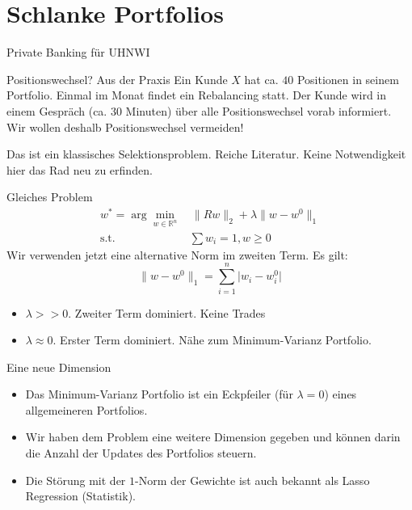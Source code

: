 \documentclass[10pt]{beamer}
\newcommand{\R}{\mathbb R}
\providecommand{\abs}[1]{\lvert#1\rvert}
\providecommand{\norm}[1]{\lVert#1\rVert}
\begin{document}
\section{Schlanke Portfolios}
\begin{frame}{Private Banking für UHNWI}
\begin{alertblock}{Positionswechsel? Aus der Praxis}
Ein Kunde $X$ hat ca. $40$ Positionen in seinem Portfolio. Einmal im Monat findet ein Rebalancing statt. Der Kunde wird in einem  Gespräch (ca. $30$ Minuten)  über alle Positionswechsel vorab informiert. Wir wollen deshalb Positionswechsel vermeiden!
\end{alertblock}

Das ist ein klassisches \alert{Selektionsproblem}. Reiche Literatur. Keine Notwendigkeit hier das Rad neu zu erfinden. 
\end{frame}

\begin{frame}{Gleiches Problem}
\begin{align}
w^*=\arg\min_{w\in\R^n}&\, \norm{Rw}_2 + \lambda \norm{w-w^0}_1 \\
\text{s.t. }&\sum w_i = 1, w\geq 0\nonumber
\end{align}
Wir verwenden jetzt eine alternative Norm im zweiten Term. Es gilt:
\[ 
\norm{w - w^0}_1 = \sum_{i=1}^n \abs{w_i-w^0_i}
\]
\begin{itemize}
\item $\lambda >> 0$. Zweiter Term dominiert. Keine Trades
\item $\lambda \approx 0$. Erster Term dominiert. Nähe zum Minimum-Varianz Portfolio.
\end{itemize}
\end{frame}

\begin{frame}{Eine neue Dimension}
\begin{itemize}
\item Das Minimum-Varianz Portfolio ist ein Eckpfeiler (für $\lambda = 0$) eines allgemeineren Portfolios.
\item Wir haben dem Problem eine weitere Dimension gegeben und können darin die Anzahl der Updates des Portfolios steuern. 
\item Die Störung mit der $1$-Norm der Gewichte ist auch bekannt als Lasso Regression (Statistik). 
\end{itemize}
\end{frame}
\end{document}
